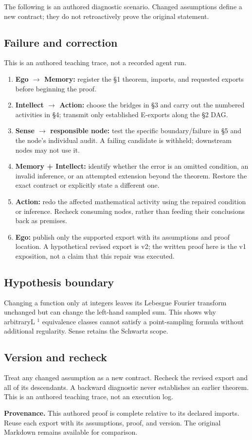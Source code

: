 \documentclass[preprint,12pt,aps,pra,showkeys,amsmath,amssymb,superscriptaddress,floatfix]{revtex4-2}
\theoremstyle{definition}
\theoremstyle{remark}
\providecommand{\tightlist}{\setlength{\itemsep}{2pt}\setlength{\parskip}{0pt}}
\begin{document}
The following is an authored diagnostic scenario. Changed assumptions
define a new contract; they do not retroactively prove the original
statement.

\subsection{Failure and correction}
This is an authored teaching trace, not a recorded agent run.

\begin{enumerate}
\def\labelenumi{\arabic{enumi}.}
\tightlist
\item
  \textbf{Ego \(\to\) Memory:} register the §1 theorem, imports, and
  requested exports before beginning the proof.
\item
  \textbf{Intellect \(\to\) Action:} choose the bridges in §3 and carry
  out the numbered activities in §4; transmit only established E-exports
  along the §2 DAG.
\item
  \textbf{Sense \(\to\) responsible node:} test the specific
  boundary/failure in §5 and the node's individual audit. A failing
  candidate is withheld; downstream nodes may not use it.
\item
  \textbf{Memory + Intellect:} identify whether the error is an omitted
  condition, an invalid inference, or an attempted extension beyond the
  theorem. Restore the exact contract or explicitly state a different
  one.
\item
  \textbf{Action:} redo the affected mathematical activity using the
  repaired condition or inference. Recheck consuming nodes, rather than
  feeding their conclusions back as premises.
\item
  \textbf{Ego:} publish only the supported export with its assumptions
  and proof location. A hypothetical revised export is v2; the written
  proof here is the v1 exposition, not a claim that this repair was
  executed.
\end{enumerate}

\subsection{Hypothesis boundary}
Changing a function only at integers leaves its Lebesgue Fourier
transform unchanged but can change the left-hand sampled sum. This shows
why arbitraryL \(^{1}\) equivalence classes cannot satisfy a
point-sampling formula without additional regularity. Sense retains the
Schwartz scope.

\subsection{Version and recheck}
Treat any changed assumption as a new contract. Recheck the revised
export and all of its descendants. A backward diagnostic never
establishes an earlier theorem. This is an authored teaching trace, not
an execution log.

\par\medskip\begingroup\small\linespread{1.0}\selectfont\noindent\textbf{Provenance.} This authored proof is complete relative to its declared imports. Reuse
each export with its assumptions, proof, and version. The original
Markdown remains available for comparison.
\par\endgroup
\end{document}
